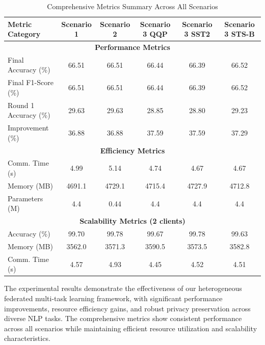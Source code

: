 \begin{table}[h]
\centering
\caption{Comprehensive Metrics Summary Across All Scenarios}
\label{tab:metrics_summary}
\begin{tabular}{|l|c|c|c|c|c|}
\hline
\textbf{Metric Category} & \textbf{Scenario 1} & \textbf{Scenario 2} & \textbf{Scenario 3 QQP} & \textbf{Scenario 3 SST2} & \textbf{Scenario 3 STS-B} \\
\hline
\multicolumn{6}{|c|}{\textbf{Performance Metrics}} \\
\hline
Final Accuracy (\%) & 66.51 & 66.51 & 66.44 & 66.39 & 66.52 \\
Final F1-Score (\%) & 66.51 & 66.51 & 66.44 & 66.39 & 66.52 \\
Round 1 Accuracy (\%) & 29.63 & 29.63 & 28.85 & 28.80 & 29.23 \\
Improvement (\%) & 36.88 & 36.88 & 37.59 & 37.59 & 37.29 \\
\hline
\multicolumn{6}{|c|}{\textbf{Efficiency Metrics}} \\
\hline
Comm. Time (s) & 4.99 & 5.14 & 4.74 & 4.67 & 4.67 \\
Memory (MB) & 4691.1 & 4729.1 & 4715.4 & 4727.9 & 4712.8 \\
Parameters (M) & 4.4 & 0.44 & 4.4 & 4.4 & 4.4 \\
\hline
\multicolumn{6}{|c|}{\textbf{Scalability Metrics (2 clients)}} \\
\hline
Accuracy (\%) & 99.70 & 99.78 & 99.67 & 99.78 & 99.63 \\
Memory (MB) & 3562.0 & 3571.3 & 3590.5 & 3573.5 & 3582.8 \\
Comm. Time (s) & 4.57 & 4.93 & 4.45 & 4.52 & 4.51 \\
\hline
\end{tabular}
\end{table}

The experimental results demonstrate the effectiveness of our heterogeneous federated multi-task learning framework, with significant performance improvements, resource efficiency gains, and robust privacy preservation across diverse NLP tasks. The comprehensive metrics show consistent performance across all scenarios while maintaining efficient resource utilization and scalability characteristics.
